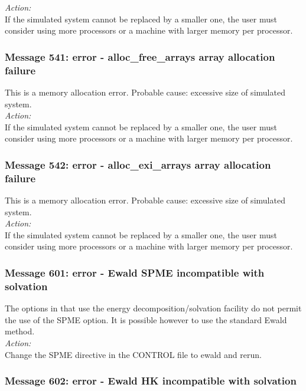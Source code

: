 \noindent
{\em Action:}\\
If the simulated system cannot be replaced by a smaller one, the user
must consider using more processors or a machine with larger memory
per processor.

\subsubsection*{Message 541: error - alloc\_free\_arrays array allocation failure}

This is a memory allocation error. Probable cause: excessive size of
simulated system. \\

\noindent
{\em Action:}\\
If the simulated system cannot be replaced by a smaller one, the user
must consider using more processors or a machine with larger memory
per processor.

\subsubsection*{Message 542: error - alloc\_exi\_arrays array allocation failure}

This is a memory allocation error. Probable cause: excessive size of
simulated system. \\

\noindent
{\em Action:}\\
If the simulated system cannot be replaced by a smaller one, the user
must consider using more processors or a machine with larger memory
per processor.

\subsubsection*{Message 601: error - Ewald SPME incompatible with solvation}

The options in \D{} that use the energy decomposition/solvation facility do not
permit the use of the SPME option. It is possible however to use the standard
Ewald method.\\

\noindent
{\em Action:}\\
Change the SPME directive in the CONTROL file to ewald and rerun.

\subsubsection*{Message 602: error - Ewald HK incompatible with solvation}

